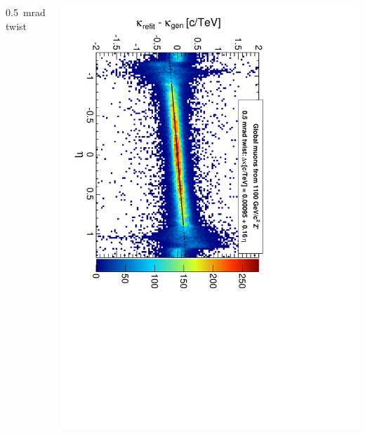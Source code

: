 \documentclass[compress]{beamer}
\begin{document}
\begin{frame}
\begin{columns}
\begin{center}
0.5~mrad twist
\end{center}
\includegraphics[height=\linewidth, angle=90]{curvbias_vseta_twist0_5mrad_1100_GlobalMuons2.pdf}
\end{columns}
\end{frame}
\end{document}
